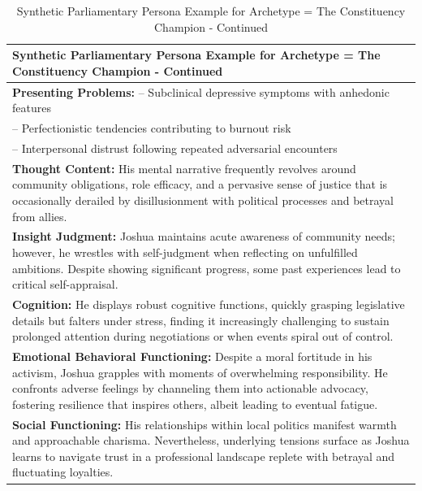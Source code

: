 \documentclass[11pt]{article}
\begin{document}
\begin{table}[ht]
\centering
\caption{Synthetic Parliamentary Persona Example for Archetype = The Constituency Champion - Continued}
\label{tab:parliamentry-persona-example-8}
\scriptsize %
\begin{tabularx}{\textwidth}{X}
\toprule
\textbf{Synthetic Parliamentary Persona Example for Archetype = The Constituency Champion - Continued} \\
\midrule
\textbf{Presenting Problems:}
– Subclinical depressive symptoms with anhedonic features \\
– Perfectionistic tendencies contributing to burnout risk \\
– Interpersonal distrust following repeated adversarial encounters \\[4pt]

\textbf{Thought Content:} His mental narrative frequently revolves around community obligations, role efficacy, and a pervasive sense of justice that is occasionally derailed by disillusionment with political processes and betrayal from allies. \\[4pt]

\textbf{Insight Judgment:} Joshua maintains acute awareness of community needs; however, he wrestles with self-judgment when reflecting on unfulfilled ambitions. Despite showing significant progress, some past experiences lead to critical self-appraisal. \\[4pt]

\textbf{Cognition:} He displays robust cognitive functions, quickly grasping legislative details but falters under stress, finding it increasingly challenging to sustain prolonged attention during negotiations or when events spiral out of control. \\[4pt]

\textbf{Emotional Behavioral Functioning:} Despite a moral fortitude in his activism, Joshua grapples with moments of overwhelming responsibility. He confronts adverse feelings by channeling them into actionable advocacy, fostering resilience that inspires others, albeit leading to eventual fatigue. \\[4pt]

\textbf{Social Functioning:} His relationships within local politics manifest warmth and approachable charisma. Nevertheless, underlying tensions surface as Joshua learns to navigate trust in a professional landscape replete with betrayal and fluctuating loyalties. \\[4pt]


\end{tabularx}
\end{table}
\end{document}
